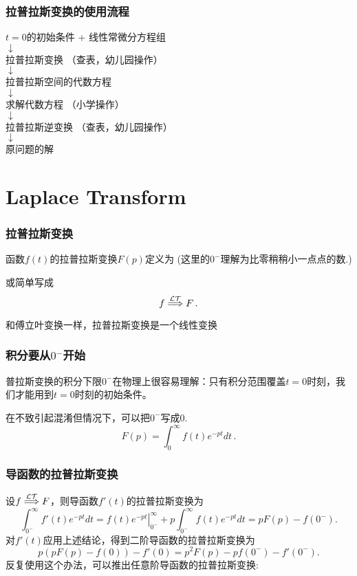 \documentclass[CJK]{beamer}
\begin{document}
\begin{frame}
  \frametitle{  拉普拉斯变换的使用流程}

  \bcenter
  $t=0$的初始条件 + 线性常微分方程组 \\
  $\downarrow$ \\
  拉普拉斯变换 （查表，幼儿园操作）\\
  $\downarrow$ \\
  拉普拉斯空间的代数方程 \\
  $\downarrow$ \\
  求解代数方程 （小学操作）\\
  $\downarrow$ \\  
  拉普拉斯逆变换 （查表，幼儿园操作）\\
  $\downarrow$ \\
  原问题的解
  \ecenter
  
\end{frame}



\section{Laplace Transform}


\begin{frame}
\frametitle{拉普拉斯变换}

函数$f(t)$的拉普拉斯变换$F(p)$定义为
(这里的$0^-$理解为比零稍稍小一点点的数.)

  或简单写成
  {\blue  $$ f \stackrel{\mathcal{LT}}{\Longrightarrow} F\,. $$}

  和傅立叶变换一样，拉普拉斯变换是一个线性变换

\end{frame}


\begin{frame}
  \frametitle{积分要从$0^-$开始}
  
  普拉斯变换的积分下限$0^-$在物理上很容易理解：只有积分范围覆盖$t=0$时刻，我们才能用到$t=0$时刻的初始条件。


    \skiplines
    
    在不致引起混淆但情况下，可以把$0^-$写成0.
    $$ F(p) = \int_{0}^\infty f(t) e^{-pt} dt\,. $$    
  
\end{frame}


\begin{frame}
\frametitle{导函数的拉普拉斯变换}

设$f \stackrel{\mathcal{LT}}{\Longrightarrow} F$，则导函数$f'(t)$的拉普拉斯变换为
$$ \int_{0^-}^\infty f'(t) e^{-pt} dt =\left.f(t)e^{-pt}\right\vert_{0^-}^\infty + p \int_{0^-}^\infty f(t)e^{-pt} dt = pF(p) - f(0^-). $$
对$f'(t)$应用上述结论，得到二阶导函数的拉普拉斯变换为
$$ p(pF(p) - f(0)) - f'(0) = p^2F(p) - pf(0^-) - f'(0^-).$$
反复使用这个办法，可以推出任意阶导函数的拉普拉斯变换:


\end{frame}
\end{document}

